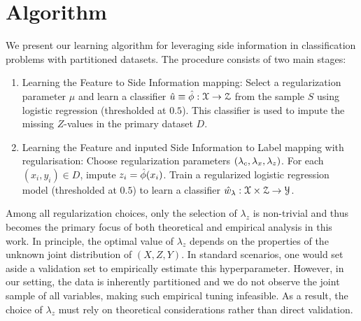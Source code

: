 \section{Algorithm}

We present our learning algorithm for leveraging side information in classification problems with partitioned datasets. The procedure consists of two main stages:

\begin{enumerate}
    \item Learning the Feature to Side Information mapping:
    Select a regularization parameter $\mu$ and learn a classifier $\hat{u} \equiv \hat{\phi}: \mathcal{X} \rightarrow \mathcal{Z}$ from the sample $S$ using logistic regression (thresholded at $0.5$). This classifier is used to impute the missing $Z$-values in the primary dataset $D$.

    \item Learning the Feature and inputed Side Information to Label mapping with regularisation:
    Choose regularization parameters $(\lambda_c, \lambda_x, \lambda_z)$. For each $(x_i, y_i) \in D$, impute $z_i = \hat{\phi}(x_i)$. Train a regularized logistic regression model (thresholded at $0.5$) to learn a classifier $\hat{w}_\lambda: \mathcal{X} \times \mathcal{Z} \rightarrow \mathcal{Y}$.
\end{enumerate}

Among all regularization choices, only the selection of $\lambda_z$ is non-trivial and thus becomes the primary focus of both theoretical and empirical analysis in this work. In principle, the optimal value of $\lambda_z$ depends on the properties of the unknown joint distribution of $(X, Z, Y)$. In standard scenarios, one would set aside a validation set to empirically estimate this hyperparameter. However, in our setting, the data is inherently partitioned and we do not observe the joint sample of all variables, making such empirical tuning infeasible. As a result, the choice of $\lambda_z$ must rely on theoretical considerations rather than direct validation.


